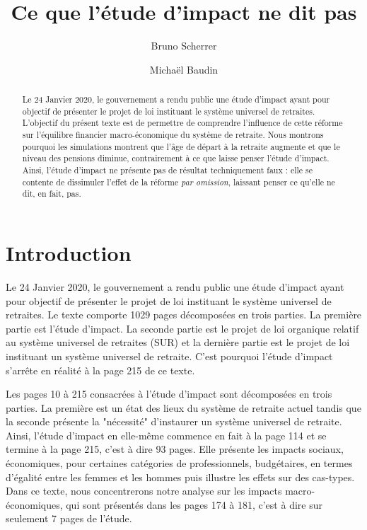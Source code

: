 \documentclass[10pt]{article}
\title{Ce que l'étude d'impact ne dit pas}
\author{Bruno Scherrer \and Michaël Baudin}
\begin{document}
\maketitle

\tableofcontents

\begin{abstract}
Le 24 Janvier 2020, le gouvernement a rendu public une 
étude d'impact ayant pour objectif de présenter le projet 
de loi instituant le système universel de retraites. 
L'objectif du présent texte est de permettre de comprendre 
l'influence de cette réforme sur l'équilibre financier macro-économique 
du système de retraite. 
Nous montrons pourquoi les simulations montrent que l'âge de départ à la 
retraite augmente et que le niveau des pensions diminue, contrairement à ce que laisse 
penser l'étude d'impact. 
Ainsi, l'étude d'impact ne présente pas de résultat techniquement faux : 
elle se contente de dissimuler l'effet de la réforme \emph{par omission}, 
laissant penser ce qu'elle ne dit, en fait, pas. 
\end{abstract}


\section{Introduction}

Le 24 Janvier 2020, le gouvernement a rendu public une 
étude d'impact \cite{EtudeImpact2020} ayant pour objectif de présenter le projet 
de loi instituant le système universel de retraites. 
Le texte comporte 1029 pages décomposées en trois parties. 
La première partie est l'étude d'impact. 
La seconde partie est le projet de loi organique relatif au système 
universel de retraites (SUR) et la dernière partie est le projet 
de loi instituant un système universel de retraite. 
C'est pourquoi l'étude d'impact s'arrête en réalité à la page 215 de ce 
texte. 

Les pages 10 à 215 consacrées à l'étude d'impact sont décomposées en trois parties. 
La première est un état des lieux du système de retraite actuel tandis que 
la seconde présente la "nécessité" d'instaurer un système universel de retraite. 
Ainsi, l'étude d'impact en elle-même commence en fait à la page 114 et se termine à la 
page 215, c'est à dire 93 pages.  
Elle présente les impacts sociaux, économiques, pour certaines catégories de professionnels, 
budgétaires, en termes d'égalité entre les femmes et les hommes puis illustre les 
effets sur des cas-types. 
Dans ce texte, nous concentrerons notre analyse sur les impacts macro-économiques, 
qui sont présentés dans les pages 174 à 181, c'est à dire sur seulement 7 pages de 
l'étude. 
\end{document}
